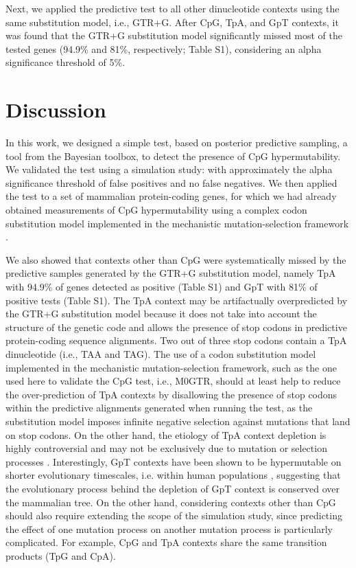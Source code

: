 \documentclass{article}
\begin{document}
Next, we applied the predictive test to all other dinucleotide contexts using the same substitution model, i.e., GTR+G. After CpG, TpA, and GpT contexts, it was found that the GTR+G substitution model significantly missed most of the tested genes (94.9\% and 81\%, respectively; Table S1), considering an alpha significance threshold of 5\%.

\section*{Discussion}
In this work, we designed a simple test, based on posterior predictive sampling, a tool from the Bayesian toolbox, to detect the presence of CpG hypermutability. We validated the test using a simulation study: with approximately the alpha significance threshold of false positives and no false negatives. We then applied the test to a set of mammalian protein-coding genes, for which we had already obtained measurements of CpG hypermutability using a complex codon substitution model implemented in the mechanistic mutation-selection framework \citep{LaurinLemay2018b}.

We also showed that contexts other than CpG were systematically missed by the predictive samples generated by the GTR+G substitution model, namely TpA with 94.9\% of genes detected as positive (Table S1) and GpT with 81\% of positive tests (Table S1). The TpA context may be artifactually overpredicted by the GTR+G substitution model because it does not take into account the structure of the genetic code and allows the presence of stop codons in predictive protein-coding sequence alignments. Two out of three stop codons contain a TpA dinucleotide (i.e., TAA and TAG). The use of a codon substitution model implemented in the mechanistic mutation-selection framework, such as the one used here to validate the CpG test, i.e., M0GTR, should at least help to reduce the over-prediction of TpA contexts by disallowing the presence of stop codons within the predictive alignments generated when running the test, as the substitution model imposes infinite negative selection against mutations that land on stop codons. On the other hand, the etiology of TpA context depletion is highly controversial and may not be exclusively due to mutation or selection processes \citep[e.g.,][]{Duret2000,Simmonds2013}.  Interestingly, GpT contexts have been shown to be hypermutable on shorter evolutionary timescales, i.e. within human populations \citep{Simmonds2013}, suggesting that the evolutionary process behind the depletion of GpT context is conserved over the mammalian tree.  On the other hand, considering contexts other than CpG should also require extending the scope of the simulation study, since predicting the effect of one mutation process on another mutation process is particularly complicated. For example, CpG and TpA contexts share the same transition products (TpG and CpA).
\end{document}
